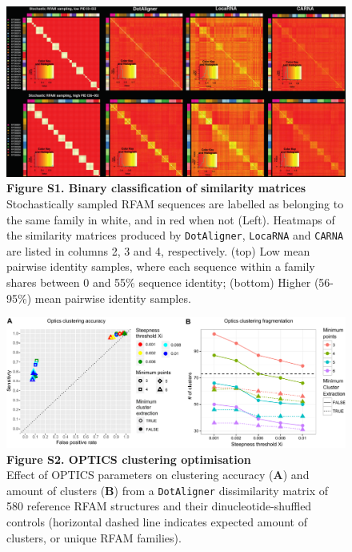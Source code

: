 \documentclass{bmcart}
\newcommand\dotaligner{\texttt{DotAligner}}
\newcommand\locarna{\texttt{LocaRNA}}
\newcommand\carna{\texttt{CARNA}}
\begin{document}
\begin{figure}
 \includegraphics[width=\textwidth]{SF1}
 \caption*{ \textbf{ Figure S1. Binary classification of similarity matrices  }\\
Stochastically sampled RFAM sequences are labelled as belonging to the same family in white, and in red when not (Left). Heatmaps of the similarity matrices produced by \dotaligner{}, \locarna{} and \carna{} are listed in columns 2, 3 and 4, respectively.  
(top) Low mean pairwise identity samples, where each sequence within 
a family shares between 0 and 55\% sequence identity; (bottom) Higher (56-95\%) mean pairwise identity samples. }
\end{figure}

\begin{figure}
 \includegraphics[width=\textwidth]{SF2}
 \caption*{ \textbf{ Figure S2. OPTICS clustering optimisation }\\
Effect of OPTICS parameters on clustering accuracy (\textbf{A}) and amount 
 of clusters (\textbf{B}) from a \dotaligner{} dissimilarity matrix of 580 reference RFAM 
 structures and their dinucleotide-shuffled controls (horizontal dashed line indicates 
 expected amount of clusters, or unique RFAM families). }
\end{figure}
\end{document}
